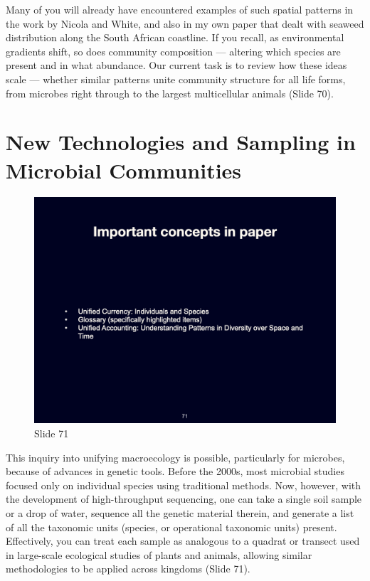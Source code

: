 \documentclass[
  10pt,
]{book}
\begin{document}
Many of you will already have encountered examples of such spatial
patterns in the work by Nicola and White, and also in my own paper that
dealt with seaweed distribution along the South African coastline. If
you recall, as environmental gradients shift, so does community
composition --- altering which species are present and in what
abundance. Our current task is to review how these ideas scale ---
whether similar patterns unite community structure for all life forms,
from microbes right through to the largest multicellular animals (Slide
70).

\section{New Technologies and Sampling in Microbial
Communities}\label{new-technologies-and-sampling-in-microbial-communities}

\begin{figure}[ht]
\centering
\includegraphics[width=0.8\linewidth]{../images/BDC334/BDC334-071.jpeg}
\caption*{Slide 71}
\end{figure}

This inquiry into unifying macroecology is possible, particularly for
microbes, because of advances in genetic tools. Before the 2000s, most
microbial studies focused only on individual species using traditional
methods. Now, however, with the development of high-throughput
sequencing, one can take a single soil sample or a drop of water,
sequence all the genetic material therein, and generate a list of all
the taxonomic units (species, or operational taxonomic units) present.
Effectively, you can treat each sample as analogous to a quadrat or
transect used in large-scale ecological studies of plants and animals,
allowing similar methodologies to be applied across kingdoms (Slide 71).
\end{document}
